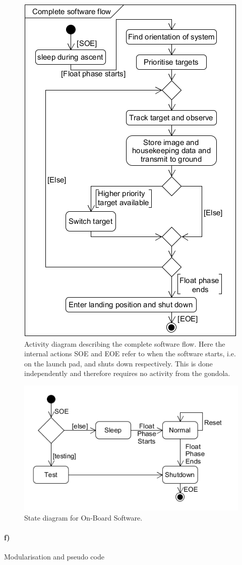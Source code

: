 \begin{figure}[H]
    \centering
    \includegraphics[width=.5\textwidth]{4-experiment-design/img/software/activity-diagram.png}
    \caption{Activity diagram describing the complete software flow. Here the internal actions SOE and EOE refer to when the software starts, i.e. on the launch pad, and shuts down respectively. This is done independently and therefore requires no activity from the gondola.}
    \label{fig:software-activity-diagram}
\end{figure}

\begin{figure}[H]
    \centering
    \includegraphics[width=.7\textwidth]{4-experiment-design/img/software/state-diagram.png}
    \caption{State diagram for On-Board Software.}
    \label{fig:software-state-diagram}
\end{figure}

\clearpage
\paragraph{f)} Modularisation and pseudo code


